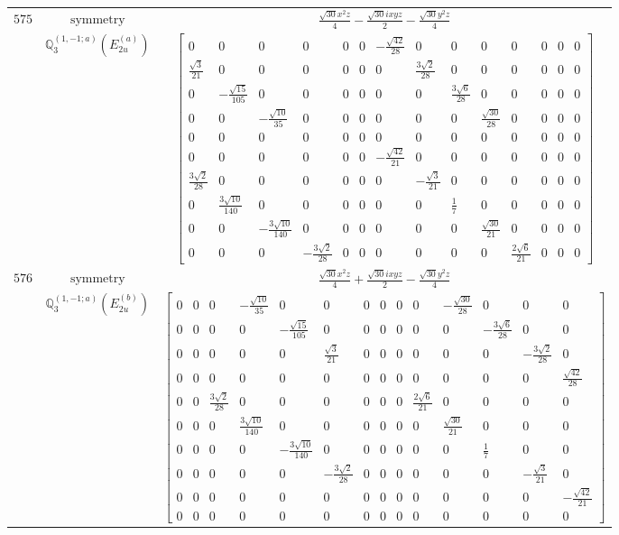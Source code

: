 \documentclass[fleqn,8pt,landscape]{jsarticle}
\begin{document}
\begin{longtable}{ccc}
$ 575 $ & $ \text{symmetry} $ & $ \frac{\sqrt{30} x^{2} z}{4} - \frac{\sqrt{30} i x y z}{2} - \frac{\sqrt{30} y^{2} z}{4} $ \\
$  $ & $ \mathbb{Q}_{3}^{(1,-1;a)}(E_{2u}^{(a)}) $ & $ \begin{bmatrix} 0 & 0 & 0 & 0 & 0 & 0 & - \frac{\sqrt{42}}{28} & 0 & 0 & 0 & 0 & 0 & 0 & 0 \\ \frac{\sqrt{3}}{21} & 0 & 0 & 0 & 0 & 0 & 0 & \frac{3 \sqrt{2}}{28} & 0 & 0 & 0 & 0 & 0 & 0 \\ 0 & - \frac{\sqrt{15}}{105} & 0 & 0 & 0 & 0 & 0 & 0 & \frac{3 \sqrt{6}}{28} & 0 & 0 & 0 & 0 & 0 \\ 0 & 0 & - \frac{\sqrt{10}}{35} & 0 & 0 & 0 & 0 & 0 & 0 & \frac{\sqrt{30}}{28} & 0 & 0 & 0 & 0 \\ 0 & 0 & 0 & 0 & 0 & 0 & 0 & 0 & 0 & 0 & 0 & 0 & 0 & 0 \\ 0 & 0 & 0 & 0 & 0 & 0 & - \frac{\sqrt{42}}{21} & 0 & 0 & 0 & 0 & 0 & 0 & 0 \\ \frac{3 \sqrt{2}}{28} & 0 & 0 & 0 & 0 & 0 & 0 & - \frac{\sqrt{3}}{21} & 0 & 0 & 0 & 0 & 0 & 0 \\ 0 & \frac{3 \sqrt{10}}{140} & 0 & 0 & 0 & 0 & 0 & 0 & \frac{1}{7} & 0 & 0 & 0 & 0 & 0 \\ 0 & 0 & - \frac{3 \sqrt{10}}{140} & 0 & 0 & 0 & 0 & 0 & 0 & \frac{\sqrt{30}}{21} & 0 & 0 & 0 & 0 \\ 0 & 0 & 0 & - \frac{3 \sqrt{2}}{28} & 0 & 0 & 0 & 0 & 0 & 0 & \frac{2 \sqrt{6}}{21} & 0 & 0 & 0 \end{bmatrix} $ \\ \hline
$ 576 $ & $ \text{symmetry} $ & $ \frac{\sqrt{30} x^{2} z}{4} + \frac{\sqrt{30} i x y z}{2} - \frac{\sqrt{30} y^{2} z}{4} $ \\
$  $ & $ \mathbb{Q}_{3}^{(1,-1;a)}(E_{2u}^{(b)}) $ & $ \begin{bmatrix} 0 & 0 & 0 & - \frac{\sqrt{10}}{35} & 0 & 0 & 0 & 0 & 0 & 0 & - \frac{\sqrt{30}}{28} & 0 & 0 & 0 \\ 0 & 0 & 0 & 0 & - \frac{\sqrt{15}}{105} & 0 & 0 & 0 & 0 & 0 & 0 & - \frac{3 \sqrt{6}}{28} & 0 & 0 \\ 0 & 0 & 0 & 0 & 0 & \frac{\sqrt{3}}{21} & 0 & 0 & 0 & 0 & 0 & 0 & - \frac{3 \sqrt{2}}{28} & 0 \\ 0 & 0 & 0 & 0 & 0 & 0 & 0 & 0 & 0 & 0 & 0 & 0 & 0 & \frac{\sqrt{42}}{28} \\ 0 & 0 & \frac{3 \sqrt{2}}{28} & 0 & 0 & 0 & 0 & 0 & 0 & \frac{2 \sqrt{6}}{21} & 0 & 0 & 0 & 0 \\ 0 & 0 & 0 & \frac{3 \sqrt{10}}{140} & 0 & 0 & 0 & 0 & 0 & 0 & \frac{\sqrt{30}}{21} & 0 & 0 & 0 \\ 0 & 0 & 0 & 0 & - \frac{3 \sqrt{10}}{140} & 0 & 0 & 0 & 0 & 0 & 0 & \frac{1}{7} & 0 & 0 \\ 0 & 0 & 0 & 0 & 0 & - \frac{3 \sqrt{2}}{28} & 0 & 0 & 0 & 0 & 0 & 0 & - \frac{\sqrt{3}}{21} & 0 \\ 0 & 0 & 0 & 0 & 0 & 0 & 0 & 0 & 0 & 0 & 0 & 0 & 0 & - \frac{\sqrt{42}}{21} \\ 0 & 0 & 0 & 0 & 0 & 0 & 0 & 0 & 0 & 0 & 0 & 0 & 0 & 0 \end{bmatrix} $ \\ \hline

\end{longtable}
\end{document}
